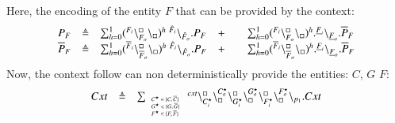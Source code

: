 Here, the encoding of the entity $F$ that can be provided by the context:
\[
\begin{array}{lcllcl}
P_F&\triangleq & \sum_{h=0}^1 ({}^{F_i}\backslash_{F_o}^{\scriptstyle {\square}}\backslash_{\scriptstyle {\square}})^h\ {}^{\hat{F}_i} \backslash_{\hat{F}_o}.P_F
& +  && \sum_{h=0}^1 ({}^{F_i}\backslash_{F_o}^{\scriptstyle {\square}}\backslash_{\scriptstyle {\square}})^h. {}^{\underline{F}_i} \backslash_{\underline{F}_o}.\overline{P}_F \\
\overline{P}_F&\triangleq & \sum_{h=0}^1 ({}^{\overline{F}_i}\backslash_{\overline{F}_o}^{\scriptstyle {\square}}\backslash_{\scriptstyle {\square}})^h\ {}^{\hat{F}_i} \backslash_{\hat{F}_o}.P_F
& +  && \sum_{h=0}^1 ({}^{\overline{F}_i}\backslash_{\overline{F}_o}^{\scriptstyle {\square}}\backslash_{\scriptstyle {\square}})^h. {}^{\underline{F}_i} \backslash_{\underline{F}_o}.\overline{P}_F \\
\end{array}
\]
Now, the context follow can non deterministically provide the entities: $C$, $G$ $F$:\\
\[
\begin{array}{lcl}
 Cxt & \triangleq &
 \sum_{\tiny \begin{array}{l}C^{\star} \in \{C,\overline{C}\}\\G^{\star} \in \{G,\overline{G}\}\\
 F^{\star} \in \{F,\overline{F}\}
  \end{array}}
 {}^{cxt} \backslash_{C_i^{\star}}^{\scriptstyle {\square}}\backslash_{\scriptstyle {\square}}^{C_o^{\star}}\backslash_{G_i^{\star}}^{\scriptstyle {\square}}\backslash_{\scriptstyle {\square}}^{G_o^{\star}}
 \backslash_{F_i^{\star}}^{\scriptstyle {\square}}\backslash_{\scriptstyle {\square}}^{F_o^{\star}}\backslash_{p_1}.Cxt\\
\end{array}
\]

